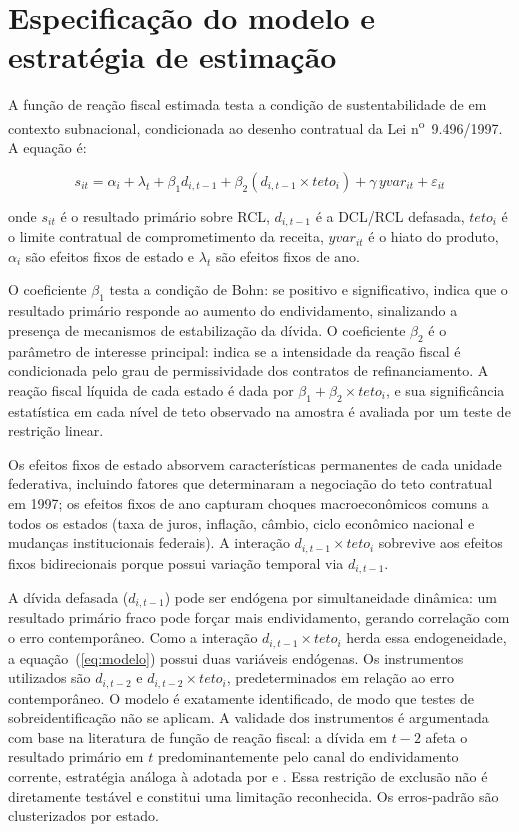 \section{Especificação do modelo e estratégia de estimação}
\label{sec:especificacao}

A função de reação fiscal estimada testa a condição de sustentabilidade de  em contexto subnacional, condicionada ao desenho contratual da Lei n\textsuperscript{o}~9.496/1997. A equação é:

\begin{equation}
s_{it} = \alpha_i + \lambda_t + \beta_1 d_{i,t-1} + \beta_2 (d_{i,t-1} \times teto_i) + \gamma \, yvar_{it} + \varepsilon_{it}
\label{eq:modelo}
\end{equation}

\noindent onde $s_{it}$ é o resultado primário sobre RCL, $d_{i,t-1}$ é a DCL/RCL defasada, $teto_i$ é o limite contratual de comprometimento da receita, $yvar_{it}$ é o hiato do produto, $\alpha_i$ são efeitos fixos de estado e $\lambda_t$ são efeitos fixos de ano.

O coeficiente $\beta_1$ testa a condição de Bohn: se positivo e significativo, indica que o resultado primário responde ao aumento do endividamento, sinalizando a presença de mecanismos de estabilização da dívida. O coeficiente $\beta_2$ é o parâmetro de interesse principal: indica se a intensidade da reação fiscal é condicionada pelo grau de permissividade dos contratos de refinanciamento. A reação fiscal líquida de cada estado é dada por $\beta_1 + \beta_2 \times teto_i$, e sua significância estatística em cada nível de teto observado na amostra é avaliada por um teste de restrição linear.

Os efeitos fixos de estado absorvem características permanentes de cada unidade federativa, incluindo fatores que determinaram a negociação do teto contratual em 1997; os efeitos fixos de ano capturam choques macroeconômicos comuns a todos os estados (taxa de juros, inflação, câmbio, ciclo econômico nacional e mudanças institucionais federais). A interação $d_{i,t-1} \times teto_i$ sobrevive aos efeitos fixos bidirecionais porque possui variação temporal via $d_{i,t-1}$.

A dívida defasada ($d_{i,t-1}$) pode ser endógena por simultaneidade dinâmica: um resultado primário fraco pode forçar mais endividamento, gerando correlação com o erro contemporâneo. Como a interação $d_{i,t-1} \times teto_i$ herda essa endogeneidade, a equação~(\ref{eq:modelo}) possui duas variáveis endógenas. Os instrumentos utilizados são $d_{i,t-2}$ e $d_{i,t-2} \times teto_i$, predeterminados em relação ao erro contemporâneo. O modelo é exatamente identificado, de modo que testes de sobreidentificação não se aplicam. A validade dos instrumentos é argumentada com base na literatura de função de reação fiscal: a dívida em $t-2$ afeta o resultado primário em $t$ predominantemente pelo canal do endividamento corrente, estratégia análoga à adotada por  e . Essa restrição de exclusão não é diretamente testável e constitui uma limitação reconhecida. Os erros-padrão são clusterizados por estado.

